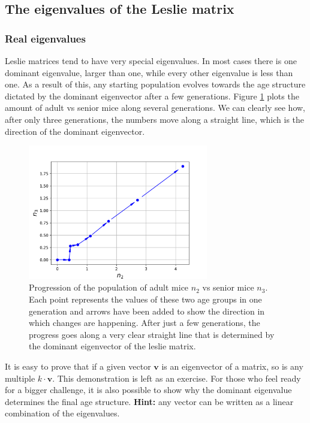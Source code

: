 \documentclass[12pt]{article}
\begin{document}
\subsection{The eigenvalues of the Leslie matrix}

\subsubsection{Real eigenvalues}
Leslie matrices tend to have very special eigenvalues. In most cases there is one dominant eigenvalue, larger than one, while every other eigenvalue is less than one. As a result of this, any starting population evolves towards the age structure dictated by the dominant eigenvector after a few generations. Figure \ref{fig:leslie_phase} plots the amount of adult vs senior mice along several generations. We can clearly see how, after only three generations, the numbers move along a straight line, which is the direction of the dominant eigenvector.

\begin{figure}
	\begin{center}
		\includegraphics[width=0.7\textwidth]{project_n2_n3}	
	\end{center}
	\caption{Progression of the population of adult mice $n_2$ vs senior mice $n_3$. Each point represents the values of these two age groups in one generation and arrows have been added to show the direction in which changes are happening. After just a few generations, the progress goes along a very clear straight line that is determined by the dominant eigenvector of the leslie matrix. }
	\label{fig:leslie_phase}
\end{figure}

It is easy to prove that if a given vector $\mathbf{v}$ is an eigenvector of a matrix, so is any multiple $k \cdot\mathbf{v}$. This demonstration is left as an exercise. For those who feel ready for a bigger challenge, it is also possible to show why the dominant eigenvalue determines the final age structure. \textbf{Hint:} any vector can be written as a linear combination of the eigenvalues.
\end{document}
